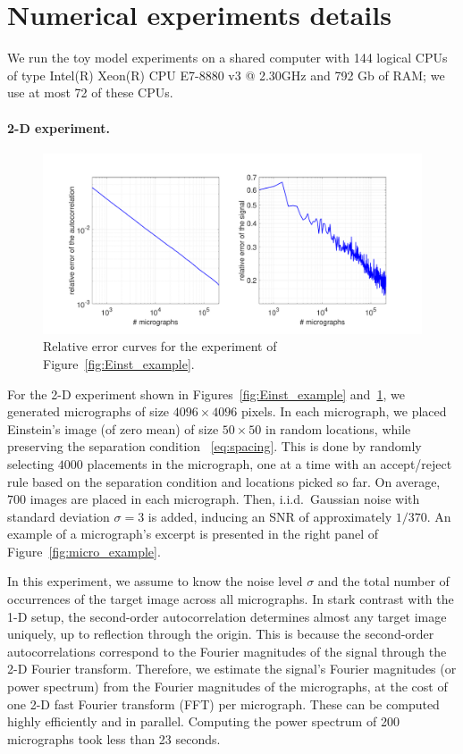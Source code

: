 \documentclass[9pt,twocolumn,twoside,lineno]{pnas-new}
\begin{document}
\appendix

\section{Numerical experiments details} \label{sec:numeric_details}

We run the toy model experiments on a shared computer with 144 logical CPUs of type Intel(R) Xeon(R) CPU E7-8880 v3 @ 2.30GHz and 792 Gb of RAM; we use at most 72 of these CPUs.

\paragraph{2-D experiment.}


\begin{figure}[t]
	\centering
	\includegraphics[scale=0.28]{Einstein_recovery_error_combined}
	\caption{\label{fig:error_per_micro}Relative error curves for the experiment of Figure~\ref{fig:Einst_example}.}
\end{figure}

For the 2-D experiment shown in Figures~\ref{fig:Einst_example} and~\ref{fig:error_per_micro}, we generated micrographs of size $4096\times 4096$ pixels. 
In each micrograph, we placed Einstein's image (of zero mean) of size $50\times 50$  in random locations, while preserving the separation condition ~\eqref{eq:spacing}.  
This is done by randomly selecting $4000$ placements in the micrograph, one at a time with
an accept/reject rule based on the separation condition and locations picked so far.
On average, $700$ images are placed in each micrograph.   
Then, i.i.d.\ Gaussian noise with standard deviation $\sigma=3$ is added, inducing an SNR of approximately $1/370$.
An example of a micrograph's excerpt is presented in the right panel of Figure~\ref{fig:micro_example}.

In this experiment, we assume to know the noise level $\sigma$ and the total number of occurrences of the target image across all micrographs.
In stark contrast with the 1-D setup, the second-order autocorrelation determines almost any target image uniquely, up to reflection through the origin. This is because the second-order autocorrelations correspond to the Fourier magnitudes of the signal through the 2-D Fourier transform. 
Therefore, we estimate the signal's Fourier magnitudes (or power spectrum) from the Fourier magnitudes of the micrographs, at the cost of one 2-D fast Fourier transform (FFT) per micrograph. These can be computed highly efficiently and in parallel.
Computing the power spectrum of 200 micrographs took less than 23 seconds. 
\end{document}
